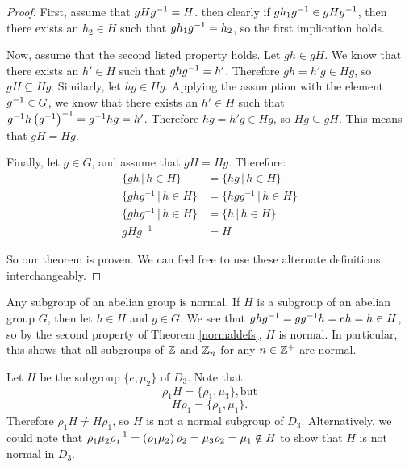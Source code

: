 \begin{proof}
First, assume that $gH\inv{g} = H$. then clearly if $gh_1\inv{g} \in gH\inv{g}$, then there exists an $h_2 \in H$ such that $gh_1\inv{g} = h_2$, so the first implication holds.

Now, assume that the second listed property holds. Let $gh \in gH$. We know that there exists an $h' \in H$ such that $gh\inv{g} = h'$. Therefore $gh = h'g \in Hg$, so $gH \subseteq Hg$. Similarly, let $hg \in Hg$. Applying the assumption with the element $\inv{g} \in G$, we know that there exists an $h' \in H$ such that $\inv{g}h\left(\inv{g}\right)^{-1} = \inv{g}hg = h'$. Therefore $hg = h'g \in Hg$, so $Hg \subseteq gH$. This means that $gH = Hg$.

Finally, let $g \in G$, and assume that $gH = Hg$. Therefore:
\begin{align*}
    \{gh \,|\, h \in H\} &= \{hg \,|\, h \in H\} \\
    \{ghg^{-1} \,|\, h \in H\} &= \{hgg^{-1} \,|\, h \in H\} \\
    \{ghg^{-1} \,|\, h \in H\} &= \{h \,|\, h \in H\} \\
    gHg^{-1} &= H
\end{align*}

So our theorem is proven. We can feel free to use these alternate definitions interchangeably.

\end{proof}

\begin{example}
Any subgroup of an abelian group is normal. If $H$ is a subgroup of an abelian group $G$, then let $h \in H$ and $g \in G$. We see that $gh\inv g = g \inv g h = eh = h \in H$, so by the second property of Theorem \ref{normaldefs}, $H$ is normal. In particular, this shows that all subgroups of $\z$ and $\zn[n]$ for any $n \in \z^+$ are normal.
\end{example}

\begin{example}
\label{not_normal_d3}
Let $H$ be the subgroup $\{e, \mu_2\}$ of $D_3$. Note that
\begin{equation*}
    \rho_1 H = \{\rho_1, \mu_3\}\mathrm{, but}
\end{equation*}
\begin{equation*}
    H \rho_1 = \{\rho_1, \mu_1\}.
\end{equation*}
Therefore $\rho_1 H \neq H\rho_1$, so $H$ is not a normal subgroup of $D_3$. Alternatively, we could note that $\rho_1\mu_2\inv{\rho_1} = \left(\rho_1 \mu_2\right)\rho_2 = \mu_3 \rho_2 = \mu_1 \notin H$ to show that $H$ is not normal in $D_3$.
\end{example}

